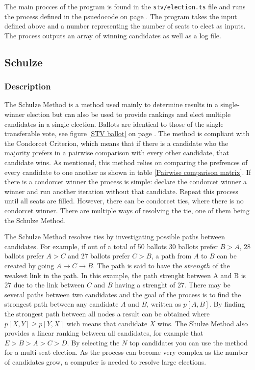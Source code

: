 \documentclass[12pt]{article}
\begin{document}
The main procces of the program is found in the \texttt{stv/election.ts} file and runs the process defined in the psuedocode on page \pageref{Stv psuedocode}. The program takes the input defined above and a number representing the number of seats to elect as inputs. The process outputs an array of winning candidates as well as a log file.

\subsection{Schulze}
\subsubsection{Description}
The Schulze Method is a method used mainly to determine results in a single-winner election but can also be used to provide rankings and elect multiple candidates in a single election. Ballots are identical to those of the single transferable vote, see figure \ref{STV ballot} on page \pageref{STV ballot}. The method is compliant with the Condorcet Criterion, which means that if there is a candidate who the majority prefers in a pairwise comparison with every other candidate, that candidate wins. As mentioned, this method relies on comparing the prefrences of every candidate to one another as shown in table \ref{Pairwise comparison matrix}. If there is a condorcet winner the process is simple: declare the condorcet winner a winner and run another iteration without that candidate. Repeat this process until all seats are filled. However, there can be condorcet ties, where there is no condorcet winner. There are multiple ways of resolving the tie, one of them being the Schulze Method.

The Schulze Method resolves ties by investigating possible paths between candidates. For example, if out of a total of 50 ballots 30 ballots prefer $B>A$, 28 ballots prefer $A>C$ and 27 ballots prefer $C>B$, a path from $A$ to $B$ can be created by going $A \rightarrow C \rightarrow B$. The path is said to have the $strength$ of the weakest link in the path. In this example, the path strenght between A and B is 27 due to the link between $C$ and $B$ having a strenght of 27. There may be several paths between two candidates and the goal of the process is to find the strongest path between any candidate $A$ and $B$, written as $p[A,B]$. By finding the strongest path between all nodes a result can be obtained where $p[X,Y] \geq p[Y,X]$ wich means that candidate $X$ wins. The Shulze Method also provides a linear ranking between all candidates, for example that $E > B > A > C > D$. By selecting the $N$ top candidates you can use the method for a multi-seat election. As the process can become very complex as the number of candidates grow, a computer is needed to resolve large elections.
\end{document}

